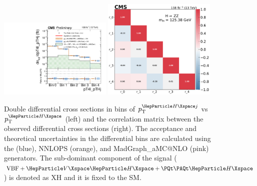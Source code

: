 \begin{center}
	\begin{figure}[!htb]
		\centering
		\includegraphics[width=0.48\textwidth]{Images/H4L/doublediff/pT4l_pTHj_unfoldwith_SM_125_logscale_asimov.pdf}
		\includegraphics[width=0.48\textwidth]{Images/H4L/correlations/corr_pT4l_pTHj_v3.pdf}\\
		\caption{
			Double differential cross sections in bins of $\pt^{\PH j}$ vs $\pt^{\PH}$  (left) and the correlation matrix between the observed differential cross sections (right).
			The acceptance and theoretical uncertainties in the differential bins are calculated using the \POWHEG (blue), NNLOPS (orange), and MadGraph\_aMC@NLO (pink) generators.
			The sub-dominant component of the signal ($\VBF + \VH + \ttH$) is denoted as XH and it is fixed to the SM.
			\label{fig:fidPTHPTHJ}}
	\end{figure}
\end{center}

\clearpage

